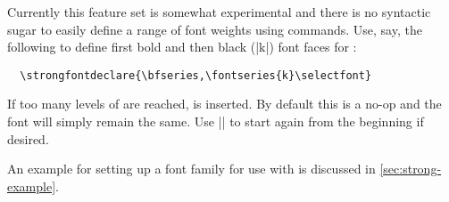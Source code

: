 \documentclass[a4paper]{l3doc}
\begin{document}
\DescribeMacro{\strongfontdeclare}
Currently this feature set is somewhat experimental and there is no syntactic sugar
to easily define a range of font weights using  commands.
Use, say, the following to define first bold and then black (|k|) font faces for :
\begin{Verbatim}
  \strongfontdeclare{\bfseries,\fontseries{k}\selectfont}
\end{Verbatim}

\DescribeMacro{\strongreset}
If too many levels of  are reached,  is inserted.
By default this is a no-op and the font will simply remain the same.
Use |{\mdseries}| to start again from the beginning if desired.

An example for setting up a font family for use with  is discussed in \vref{sec:strong-example}.
\end{document}
